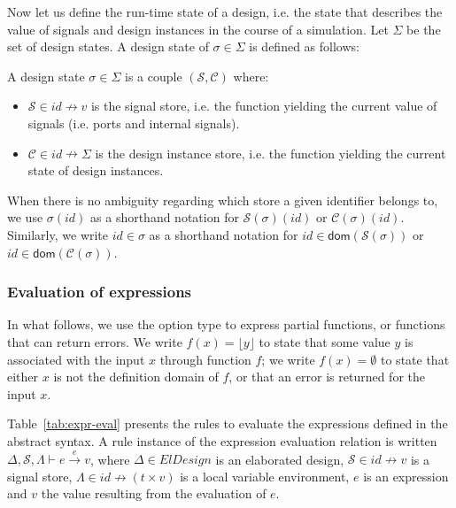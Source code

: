Now let us define the run-time state of a design, i.e. the state that
describes the value of signals and design instances in the course of a
simulation. Let $\Sigma$ be the set of design states.  A design state
of $\sigma\in{}\Sigma$ is defined as follows:

\begin{definition}
  \label{def:design-state}
  A design state $\sigma\in\Sigma$ is a couple
  $(\mathcal{S},\mathcal{C})$ where:
  \begin{itemize}[label=$-$]
  \item $\mathcal{S}\in{}id\nrightarrow{}v$ is the signal store,
    i.e. the function yielding the current value of signals
    (i.e. ports and internal signals).
  \item $\mathcal{C}\in{}id\nrightarrow{}\Sigma$ is the design
    instance store, i.e.  the function yielding the current state of
    design instances.
  \end{itemize}
\end{definition}

When there is no ambiguity regarding which store a given identifier
belongs to, we use $\sigma(id)$ as a shorthand notation for
$\mathcal{S}(\sigma)(id)$ or $\mathcal{C}(\sigma)(id)$.  Similarly, we
write $id\in\sigma$ as a shorthand notation for
$id\in\mathsf{dom}(\mathcal{S}(\sigma))$ or
$id\in\mathsf{dom}(\mathcal{C}(\sigma))$.

\subsubsection{Evaluation of expressions}
\label{subsubsec:expr-eval}

In what follows, we use the option type to express partial functions,
or functions that can return errors.  We write
$f(x)=\lfloor{}y\rfloor$ to state that some value $y$ is associated
with the input $x$ through function $f$; we write $f(x)=\emptyset$ to
state that either $x$ is not the definition domain of $f$, or that an
error is returned for the input $x$.

Table~\ref{tab:expr-eval} presents the rules to evaluate the
expressions defined in the \hvhdl{} abstract syntax. A rule instance
of the expression evaluation relation is written
$\Delta,\mathcal{S},\Lambda\vdash{}e\xrightarrow{e}v$, where
$\Delta\in{}ElDesign$ is an elaborated design,
$\mathcal{S}\in{}id\nrightarrow{}v$ is a signal store,
$\Lambda\in{}id\nrightarrow(t\times{}v)$ is a local variable
environment, $e$ is an expression and $v$ the value resulting from the
evaluation of $e$.

